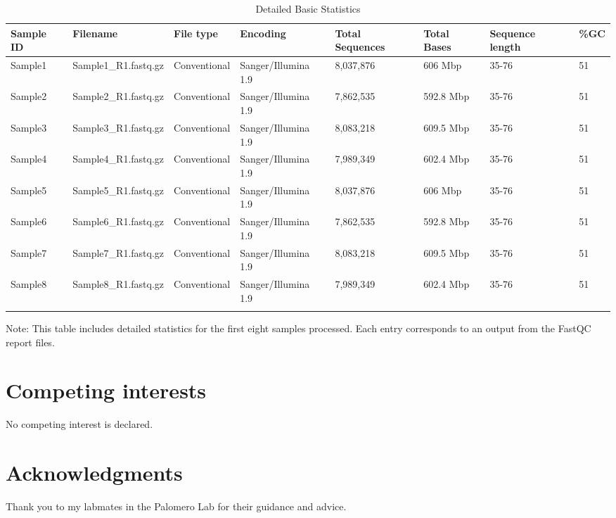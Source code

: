 \documentclass[unnumsec,webpdf,contemporary,large]{oup-authoring-template}
\theoremstyle{thmstyleone}%
\theoremstyle{thmstyletwo}%
\theoremstyle{thmstylethree}%
\begin{document}
\begin{table}[htbp]
\caption{Detailed Basic Statistics\label{tab2}}
\centering
\begin{tabular}{@{}llllllll@{}}
\toprule
Sample ID & Filename & File type & Encoding & Total Sequences & Total Bases & Sequence length & \%GC \\
\midrule
Sample1 & Sample1_R1.fastq.gz & Conventional & Sanger/Illumina 1.9 & 8,037,876 & 606 Mbp & 35-76 & 51 \\
Sample2 & Sample2_R1.fastq.gz & Conventional & Sanger/Illumina 1.9 & 7,862,535 & 592.8 Mbp & 35-76 & 51 \\
Sample3 & Sample3_R1.fastq.gz & Conventional & Sanger/Illumina 1.9 & 8,083,218 & 609.5 Mbp & 35-76 & 51 \\
Sample4 & Sample4_R1.fastq.gz & Conventional & Sanger/Illumina 1.9 & 7,989,349 & 602.4 Mbp & 35-76 & 51 \\
Sample5 & Sample5_R1.fastq.gz & Conventional & Sanger/Illumina 1.9 & 8,037,876 & 606 Mbp & 35-76 & 51 \\
Sample6 & Sample6_R1.fastq.gz & Conventional & Sanger/Illumina 1.9 & 7,862,535 & 592.8 Mbp & 35-76 & 51 \\
Sample7 & Sample7_R1.fastq.gz & Conventional & Sanger/Illumina 1.9 & 8,083,218 & 609.5 Mbp & 35-76 & 51 \\
Sample8 & Sample8_R1.fastq.gz & Conventional & Sanger/Illumina 1.9 & 7,989,349 & 602.4 Mbp & 35-76 & 51 \\
\botrule
\end{tabular}
\begin{tablenotes}%
\item Note: This table includes detailed statistics for the first eight samples processed. Each entry corresponds to an output from the FastQC report files.
\end{tablenotes}
\end{table}

\section{Competing interests}
No competing interest is declared.

\section{Acknowledgments}
Thank you to my labmates in the Palomero Lab for their guidance and advice.
\end{document}
